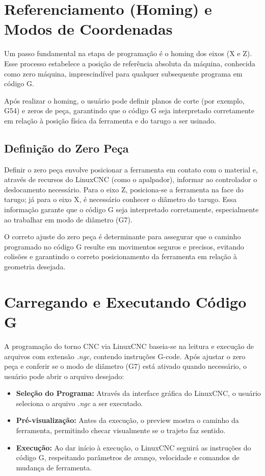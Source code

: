 \section{Referenciamento (Homing) e Modos de Coordenadas}

Um passo fundamental na etapa de programação é o homing dos eixos (X e Z). Esse processo estabelece a posição de referência absoluta da máquina, conhecida como zero máquina, imprescindível para qualquer subsequente programa em código G. 

Após realizar o homing, o usuário pode definir planos de corte (por exemplo, G54) e zeros de peça, garantindo que o código G seja interpretado corretamente em relação à posição física da ferramenta e do tarugo a ser usinado.

\subsection{Definição do Zero Peça}

Definir o zero peça envolve posicionar a ferramenta em contato com o material e, através de recursos do LinuxCNC (como o apalpador), informar ao controlador o deslocamento necessário. Para o eixo Z, posiciona-se a ferramenta na face do tarugo; já para o eixo X, é necessário conhecer o diâmetro do tarugo. Essa informação garante que o código G seja interpretado corretamente, especialmente ao trabalhar em modo de diâmetro (G7).

O correto ajuste do zero peça é determinante para assegurar que o caminho programado no código G resulte em movimentos seguros e precisos, evitando colisões e garantindo o correto posicionamento da ferramenta em relação à geometria desejada.

\section{Carregando e Executando Código G}

A programação do torno CNC via LinuxCNC baseia-se na leitura e execução de arquivos com extensão \textit{.ngc}, contendo instruções G-code. Após ajustar o zero peça e conferir se o modo de diâmetro (G7) está ativado quando necessário, o usuário pode abrir o arquivo desejado:

\begin{itemize}
    \item \textbf{Seleção do Programa:} Através da interface gráfica do LinuxCNC, o usuário seleciona o arquivo \textit{.ngc} a ser executado.
    \item \textbf{Pré-visualização:} Antes da execução, o preview mostra o caminho da ferramenta, permitindo checar visualmente se o trajeto faz sentido.
    \item \textbf{Execução:} Ao dar início à execução, o LinuxCNC seguirá as instruções do código G, respeitando parâmetros de avanço, velocidade e comandos de mudança de ferramenta.
\end{itemize}

